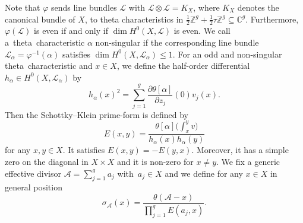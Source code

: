 \documentclass[10pt,a4paper]{amsart}
\numberwithin{equation}{section}
\begin{document}
Note that $\varphi$ sends line bundles $\mathscr{L}$ with $\mathscr{L}\otimes\mathscr{L}=K_X$, where $K_X$ denotes the canonical bundle of $X$, to theta characteristics in $\frac{1}{2}\mathbb{Z}^g+\frac{1}{2}\tau\mathbb{Z}^g\subseteq \mathbb{C}^g$. Furthermore, $\varphi(\mathscr{L})$ is even if and only if $\dim H^0(X,\mathscr{L})$ is even. We call a~theta~characteristic $\alpha$ non-singular if the corresponding line bundle $\mathscr{L}_\alpha=\varphi^{-1}(\alpha)$ satisfies $\dim H^0(X,\mathscr{L}_\alpha)\le 1$.
For an odd and non-singular theta~characteristic  and $x\in X$, we define the half-order differential $h_\alpha\in H^0(X,\mathscr{L}_\alpha)$ by
\[h_{\alpha}(x)^2=\sum_{j=1}^g\frac{\partial\theta[\alpha]}{\partial z_j}(0)v_j(x).\]
Then the Schottky--Klein prime-form is defined by
\[
E(x,y)=\frac{\theta[\alpha]\bigl(\int_x^yv\bigr)}{h_{\alpha}(x)h_{\alpha}(y)}
\]
for any $x,y\in X$. It satisfies $E(x,y)=-E(y,x)$. Moreover, it has a simple zero on the diagonal in $X\times X$ and it is non-zero for $x\neq y$. We fix a generic effective divisor $\mathcal{A}=\sum_{j=1}^g a_j$ with~${a_j\in X}$ and we define for any $x\in X$ in general position
\[
\sigma_{\mathcal{A}}(x)=\frac{\theta(\mathcal{A}-x)}{\prod_{j=1}^gE(a_j,x)}.
\]
\end{document}
